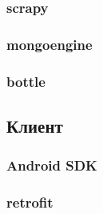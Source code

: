 		\subsubsection{scrapy}
		\subsubsection{mongoengine}
		\subsubsection{bottle}
	\subsection{Клиент}
		\subsubsection{Android SDK}
		\subsubsection{retrofit}